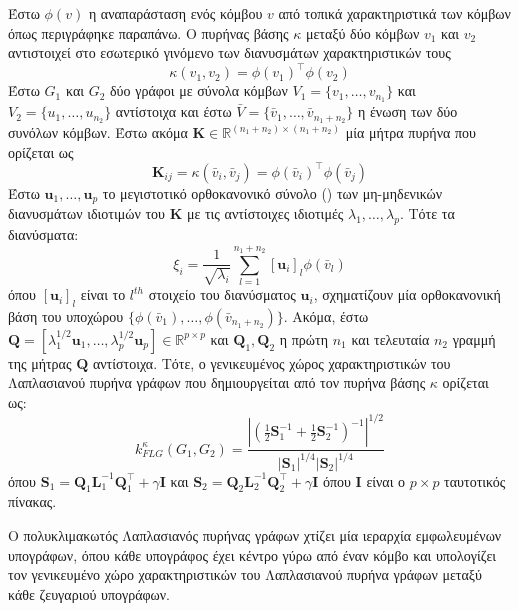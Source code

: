 Έστω $\phi(v)$ η αναπαράσταση ενός κόμβου $v$ από τοπικά χαρακτηριστικά των κόμβων όπως περιγράφηκε παραπάνω.
Ο πυρήνας βάσης $\kappa$ μεταξύ δύο κόμβων $v_1$ και $v_2$ αντιστοιχεί στο εσωτερικό γινόμενο των διανυσμάτων χαρακτηριστικών τους
\begin{equation}
    \kappa(v_1, v_2) = \phi(v_1)^\top \phi(v_2) 
\end{equation}
Έστω $G_1$ και $G_2$ δύο γράφοι με σύνολα κόμβων $V_1 = \{ v_1, \ldots, v_{n_1}\}$ και $V_2 = \{ u_1, \ldots, u_{n_2} \}$ αντίστοιχα και έστω $\bar{V} = \{ \bar{v}_1, \ldots, \bar{v}_{n_1+n_2} \}$ η ένωση των δύο συνόλων κόμβων.
Έστω ακόμα $\mathbf{K} \in \mathbb{R}^{(n_1+n_2) \times (n_1+n_2)}$ μία μήτρα πυρήνα που ορίζεται ως
\begin{equation}
    \mathbf{K}_{ij} = \kappa(\bar{v}_i, \bar{v}_j) = \phi(\bar{v}_i)^\top \phi(\bar{v}_j)
\end{equation}
Έστω $\mathbf{u}_1, \ldots, \mathbf{u}_p$ το μεγιστοτικό ορθοκανονικό σύνολο () των μη-μηδενικών διανυσμάτων ιδιοτιμών του $\mathbf{K}$
με τις αντίστοιχες ιδιοτιμές $\lambda_1, \ldots, \lambda_p$.
Τότε τα διανύσματα:
\begin{equation}
    \xi_i = \frac{1}{\sqrt{\lambda_i}} \sum_{l=1}^{n_1+n_2} [\mathbf{u}_i]_l \phi(\bar{v}_l)
\end{equation}
όπου $[\mathbf{u}_i]_l$ είναι το $l^{th}$ στοιχείο του διανύσματος $\mathbf{u}_i$, σχηματίζουν μία ορθοκανονική βάση του υποχώρου $\{ \phi(\bar{v}_1), \ldots, \phi(\bar{v}_{n_1+n_2}) \}$.
Ακόμα, έστω $\mathbf{Q} = [ \lambda_1^{1/2} \mathbf{u}_1, \ldots,\lambda_p^{1/2} \mathbf{u}_p ] \in \mathbb{R}^{p \times p}$ και $\mathbf{Q}_1, \mathbf{Q}_2$ η πρώτη $n_1$ και τελευταία $n_2 $ γραμμή της μήτρας $\mathbf{Q}$ αντίστοιχα.
Τότε, ο γενικευμένος χώρος χαρακτηριστικών του Λαπλασιανού πυρήνα γράφων που δημιουργείται από τον πυρήνα βάσης $\kappa$ ορίζεται ως:
\begin{equation}
    k_{FLG}^\kappa(G_1, G_2) = \frac{| (\frac{1}{2} \mathbf{S}_1^{-1} + \frac{1}{2} \mathbf{S}_2^{-1} )^{-1} |^{1/2}}{|\mathbf{S}_1|^{1/4} |\mathbf{S}_2|^{1/4}} 
\end{equation}
όπου $\mathbf{S}_1 = \mathbf{Q}_1 \mathbf{L}_1^{-1} \mathbf{Q}_1^\top + \gamma \mathbf{I}$ και $\mathbf{S}_2 = \mathbf{Q}_2 \mathbf{L}_2^{-1} \mathbf{Q}_2^\top + \gamma \mathbf{I}$ όπου $\mathbf{I}$ είναι ο $p \times p$ ταυτοτικός πίνακας.\par
Ο πολυκλιμακωτός Λαπλασιανός πυρήνας γράφων χτίζει μία ιεραρχία εμφωλευμένων υπογράφων, όπου κάθε υπογράφος έχει κέντρο γύρω από έναν κόμβο και υπολογίζει τον γενικευμένο χώρο χαρακτηριστικών του Λαπλασιανού πυρήνα γράφων μεταξύ κάθε ζευγαριού υπογράφων.
